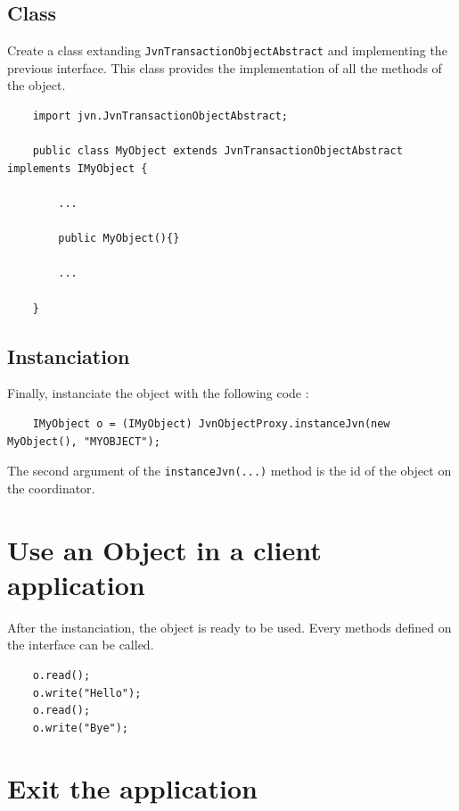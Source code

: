 \documentclass{article}
\begin{document}
\subsection{Class}

Create a class extanding \texttt{JvnTransactionObjectAbstract} and implementing the previous interface. This class provides the implementation of all the methods of the object. \\

\noindent
\begin{verbatim}
    import jvn.JvnTransactionObjectAbstract; 

    public class MyObject extends JvnTransactionObjectAbstract implements IMyObject { 
	
        ...
        
        public MyObject(){}

        ...
	 
    }
\end{verbatim}

\subsection{Instanciation}

Finally, instanciate the object with the following code : \\

\noindent
\begin{verbatim}
    IMyObject o = (IMyObject) JvnObjectProxy.instanceJvn(new MyObject(), "MYOBJECT");
\end{verbatim}
\vspace{0.3cm}

\noindent The second argument of the \texttt{instanceJvn(...)} method is the id of the object on the coordinator.

\section{Use an Object in a client application}

After the instanciation, the object is ready to be used. Every methods defined on the interface can be called. \\

\noindent
\begin{verbatim}
    o.read();
    o.write("Hello");
    o.read();
    o.write("Bye");
\end{verbatim}

\section{Exit the application}
\end{document}
